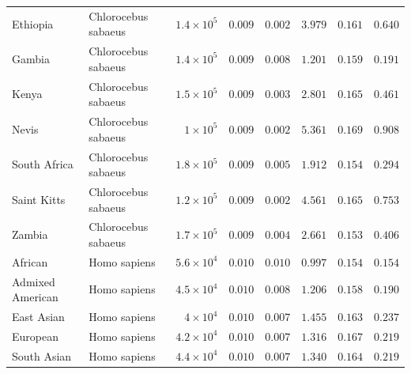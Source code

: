 \documentclass{article}
\begin{document}
\begin{center}
\begin{longtable*}{|l|l|r|r|r|r|r|r|}
             Ethiopia & Chlorocebus sabaeus & $1.4\times 10^{5}$ & $ 0.009$ & $ 0.002$ & $ 3.979$ & $ 0.161$ & $ 0.640$ \\
             Gambia & Chlorocebus sabaeus & $1.4\times 10^{5}$ & $ 0.009$ & $ 0.008$ & $ 1.201$ & $ 0.159$ & $ 0.191$ \\
             Kenya & Chlorocebus sabaeus & $1.5\times 10^{5}$ & $ 0.009$ & $ 0.003$ & $ 2.801$ & $ 0.165$ & $ 0.461$ \\
             Nevis & Chlorocebus sabaeus & $ 1\times 10^{5}$ & $ 0.009$ & $ 0.002$ & $ 5.361$ & $ 0.169$ & $ 0.908$ \\
             South Africa & Chlorocebus sabaeus & $1.8\times 10^{5}$ & $ 0.009$ & $ 0.005$ & $ 1.912$ & $ 0.154$ & $ 0.294$ \\
             Saint Kitts & Chlorocebus sabaeus & $1.2\times 10^{5}$ & $ 0.009$ & $ 0.002$ & $ 4.561$ & $ 0.165$ & $ 0.753$ \\
             Zambia & Chlorocebus sabaeus & $1.7\times 10^{5}$ & $ 0.009$ & $ 0.004$ & $ 2.661$ & $ 0.153$ & $ 0.406$ \\
            African & Homo sapiens & $5.6\times 10^{4}$ & $ 0.010$ & $ 0.010$ & $ 0.997$ & $ 0.154$ & $ 0.154$ \\
            Admixed American & Homo sapiens & $4.5\times 10^{4}$ & $ 0.010$ & $ 0.008$ & $ 1.206$ & $ 0.158$ & $ 0.190$ \\
            East Asian & Homo sapiens & $ 4\times 10^{4}$ & $ 0.010$ & $ 0.007$ & $ 1.455$ & $ 0.163$ & $ 0.237$ \\
            European & Homo sapiens & $4.2\times 10^{4}$ & $ 0.010$ & $ 0.007$ & $ 1.316$ & $ 0.167$ & $ 0.219$ \\
            South Asian & Homo sapiens & $4.4\times 10^{4}$ & $ 0.010$ & $ 0.007$ & $ 1.340$ & $ 0.164$ & $ 0.219$ \\
        \end{longtable*}
    \end{center}
\end{document}
